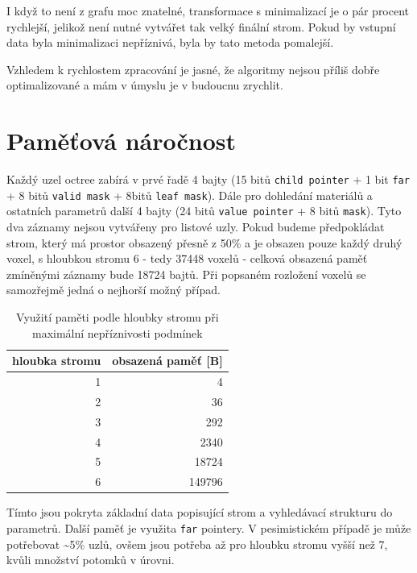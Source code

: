 I když to není z grafu moc znatelné, transformace s minimalizací je o pár procent rychlejší, jelikož není nutné vytvářet tak velký finální strom. Pokud by vstupní data byla minimalizaci nepříznivá, byla by tato metoda pomalejší.

Vzhledem k rychlostem zpracování je jasné, že algoritmy nejsou příliš dobře optimalizované a mám v úmyslu je v budoucnu zrychlit.

\section{Paměťová náročnost}
Každý uzel octree zabírá v prvé řadě 4 bajty (15 bitů \texttt{child pointer} + 1 bit \texttt{far} + 8 bitů \texttt{valid mask} + 8bitů \texttt{leaf mask}). Dále pro dohledání materiálů a ostatních parametrů další 4 bajty (24 bitů \texttt{value pointer} + 8 bitů \texttt{mask}). Tyto dva záznamy nejsou vytvářeny pro listové uzly. Pokud budeme předpokládat strom, který má prostor obsazený přesně z 50\% a je obsazen pouze každý druhý voxel, s hloubkou stromu 6 - tedy 37448 voxelů - celková obsazená paměť zmíněnými záznamy bude 18724 bajtů. Při popsaném rozložení voxelů se samozřejmě jedná o nejhorší možný případ.

\begin{table}[H]
\centering
\begin{tabular}{|r|r|}
\hline
\multicolumn{1}{|c|}{hloubka stromu} & \multicolumn{1}{c|}{obsazená paměť {[}B{]}} \\ \hline
1                                    & 4                                            \\ \hline
2                                    & 36                                           \\ \hline
3                                    & 292                                           \\ \hline
4                                    & 2340                                          \\ \hline
5                                    & 18724                                         \\ \hline
6                                    & 149796                                        \\ \hline
\end{tabular}
\caption{Využití paměti podle hloubky stromu při maximální nepříznivosti podmínek}
\end{table}

Tímto jsou pokryta základní data popisující strom a vyhledávací strukturu do parametrů. Další paměť je využita \texttt{far} pointery. V pesimistickém případě je může potřebovat \textasciitilde5\% uzlů, ovšem jsou potřeba až pro hloubku stromu vyšší než 7, kvůli množství potomků v úrovni. 

